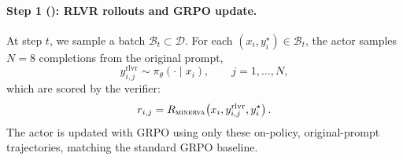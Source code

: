 \paragraph{Step 1 (): RLVR rollouts and GRPO update.}
At step $t$, we sample a batch $\mathcal{B}_t\subset\mathcal{D}$. For each $(x_i,y_i^\star)\in\mathcal{B}_t$, the actor samples $N=8$ completions from the original prompt,
\begin{equation}
    y_{i,j}^{\mathrm{rlvr}} \sim \pi_\theta(\cdot\mid x_i),
    \qquad j=1,\ldots,N ,
\end{equation}
which are scored by the verifier:
\begin{equation}
    r_{i,j}
    =
    R_{\textsc{minerva}}\!\left(x_i,y_{i,j}^{\mathrm{rlvr}},y_i^\star\right).
\end{equation}
The actor is updated with GRPO using only these on-policy, original-prompt trajectories, matching the standard GRPO baseline.






